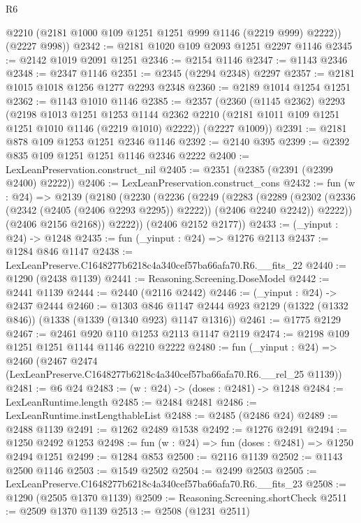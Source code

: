 \begin{lexlean}{R6}
\begin{coremodule}
        @2210
        (@2181 @1000 @109 @1251 @1251 @999 @1146 (@2219 @999) @2222))
      (@2227 @998))
@2342 := @2181 @1020 @109 @2093 @1251 @2297 @1146
@2345 := @2142 @1019 @2091 @1251
@2346 := @2154 @1146
@2347 := @1143 @2346
@2348 := @2347 @1146
@2351 := @2345 (@2294 @2348) @2297
@2357 := @2181 @1015 @1018 @1256 @1277 @2293 @2348
@2360 := @2189 @1014 @1254 @1251
@2362 := @1143 @1010 @1146
@2385 := @2357
    (@2360
      (@1145 @2362)
      @2293
      (@2198
        @1013
        @1251
        @1253
        @1144
        @2362
        @2210
        (@2181 @1011 @109 @1251 @1251 @1010 @1146 (@2219 @1010) @2222))
      (@2227 @1009))
@2391 := @2181 @878 @109 @1253 @1251 @2346 @1146
@2392 := @2140 @395
@2399 := @2392 @835 @109 @1251 @1251 @1146 @2346 @2222
@2400 := LexLeanPreservation.construct_nil
@2405 := @2351 (@2385 (@2391 (@2399 @2400) @2222))
@2406 := LexLeanPreservation.construct_cons
@2432 := fun (w : @24) =>
  @2139
    (@2180
      (@2230
        (@2236
          (@2249
            (@2283
              (@2289
                (@2302 (@2336 (@2342 (@2405 (@2406 @2293 @2295)) @2222)) (@2406 @2240 @2242))
                @2222))
            (@2406 @2156 @2168))
          @2222))
      (@2406 @2152 @2177))
@2433 := (_yinput : @24) -> @1248
@2435 := fun (_yinput : @24) => @1276 @2113
@2437 := @1284 @846 @1147
@2438 := LexLeanPreserve.C1648277b6218c4a340cef57ba66afa70.R6.__fits_22
@2440 := @1290 (@2438 @1139)
@2441 := Reasoning.Screening.DoseModel
@2442 := @2441 @1139
@2444 := @2440 (@2116 @2442)
@2446 := (_yinput : @24) -> @2437 @2444
@2460 := @1303
    @846
    @1147
    @2444
    @923
    @2129
    (@1322 (@1332 @846))
    (@1338 (@1339 (@1340 @923) @1147 @1316))
@2461 := @1775 @2129
@2467 := @2461 @920 @110 @1253 @2113 @1147 @2119
@2474 := @2198 @109 @1251 @1251 @1144 @1146 @2210 @2222
@2480 := fun (_yinput : @24) =>
  @2460 (@2467 @2474 (LexLeanPreserve.C1648277b6218c4a340cef57ba66afa70.R6.__rel_25 @1139))
@2481 := @6 @24
@2483 := (w : @24) -> (doses : @2481) -> @1248
@2484 := LexLeanRuntime.length
@2485 := @2484 @2481
@2486 := LexLeanRuntime.instLengthableList
@2488 := @2485 (@2486 @24)
@2489 := @2488 @1139
@2491 := @1262 @2489 @1538
@2492 := @1276 @2491
@2494 := @1250 @2492 @1253
@2498 := fun (w : @24) => fun (doses : @2481) => @1250 @2494 @1251
@2499 := @1284 @853
@2500 := @2116 @1139
@2502 := @1143 @2500 @1146
@2503 := @1549 @2502
@2504 := @2499 @2503
@2505 := LexLeanPreserve.C1648277b6218c4a340cef57ba66afa70.R6.__fits_23
@2508 := @1290 (@2505 @1370 @1139)
@2509 := Reasoning.Screening.shortCheck
@2511 := @2509 @1370 @1139
@2513 := @2508 (@1231 @2511)

\end{coremodule}
\end{lexlean}
